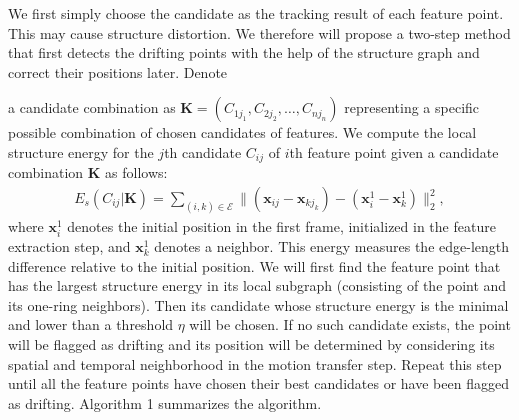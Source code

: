 We first simply choose the candidate  as the tracking result of each feature point. This may cause structure distortion. We therefore will propose a two-step method that first detects the drifting points with the help of the structure graph and correct their positions later.  
Denote {a candidate combination as $ \mathbf{K} = (C_{1j_1}, C_{2j_2},\ldots, C_{nj_n}) $ representing a specific possible combination of chosen candidates of features. 
We compute the local structure energy for the $ j $th candidate $ C_{ij} $ of $ i $th feature point given a candidate combination $ \mathbf{K} $ as follows:
\begin{align}\label{eq:structure_energy}
E_s(C_{ij}|\mathbf{K}) = \sum_{(i, k) \in \mathcal{E}} \|(\mathbf{x}_{ij} -  \mathbf{x}_{kj_k}) - (\mathbf{x}^1_{i} -  \mathbf{x}^1_{k}) \|^2_2,
\end{align}
where $ \mathbf{x}^1_i $ denotes the initial position in the first frame, initialized in the feature extraction step, and 
$\mathbf{x}^1_k$ denotes a neighbor.  This energy measures the edge-length difference relative to the initial position.
We will first find the feature point that has the largest structure energy in its local subgraph (consisting of the point and its {one-ring} neighbors). Then its candidate whose structure energy is the minimal and lower than a threshold $ \eta $ will be chosen. If no such candidate exists, the point will be flagged as drifting and {its position} will be determined by considering its spatial and temporal neighborhood in the motion transfer step. Repeat this step until all the feature points have chosen their best candidates or have been flagged as drifting. 
%
%
%
Algorithm 1 summarizes the algorithm. 

}
